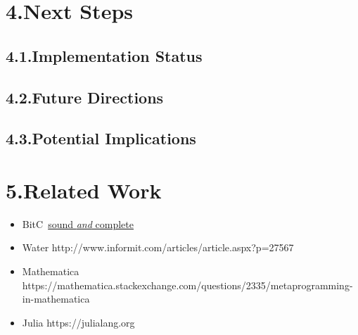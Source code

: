 \documentclass[preprint]{{sigplanconf}}
\begin{document}
\section{4.\hspace*{0.5em}Next Steps}\label{sec-next-steps}%

\subsection{4.1.\hspace*{0.5em}Implementation Status}\label{sec-implementation-status}%

\subsection{4.2.\hspace*{0.5em}Future Directions}\label{sec-future-directions}%

\subsection{4.3.\hspace*{0.5em}Potential Implications}\label{sec-potential-implications}%

\section{5.\hspace*{0.5em}Related Work}\label{sec-related-work}%

\begin{itemize}[noitemsep,topsep=\mdcompacttopsep]%

\item{}BitC~\href{www.cs.jhu.edu/~swaroop/aplas.pdf}{sound \emph{and} complete}%

\item{}Water http://www.informit.com/articles/article.aspx?p=27567%

\item{}Mathematica https://mathematica.stackexchange.com/questions/2335/metaprogramming-in-mathematica%

\item{}Julia https://julialang.org%
\end{itemize}%
\end{document}
